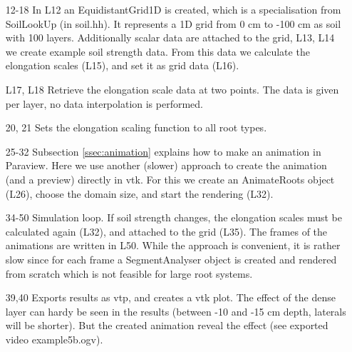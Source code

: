 \begin{itemize}

\item[12-18] In L12 an EquidistantGrid1D is created, which is a specialisation from SoilLookUp (in soil.hh). It represents a 1D grid from 0 cm to -100 cm as soil with 100 layers. Additionally scalar data are attached to the grid, L13, L14 we create example soil strength data. From this data we calculate the elongation scales (L15), and set it as grid data (L16). 

\item[L17, L18] Retrieve the elongation scale data at two points. The data is given per layer, no data interpolation is performed.

\item[20, 21] Sets the elongation scaling function to all root types.

\item[25-32] Subsection \ref{ssec:animation} explains how to make an animation in Paraview. Here we use another (slower) approach to create the animation (and a preview) directly in vtk. For this we create an AnimateRoots object (L26), choose the domain size, and start the rendering (L32). 

\item[34-50] Simulation loop. If soil strength changes, the elongation scales must be calculated again (L32), and attached to the grid (L35). The frames of the animations are written in L50. While the approach is convenient, it is rather slow since for each frame a SegmentAnalyser object is created and rendered from scratch which is not feasible for large root systems. 

\item[39,40] Exports results as vtp, and creates a vtk plot. The effect of the dense layer can hardy be seen in the results (between -10 and -15 cm depth, laterals will be shorter). But the created animation reveal the effect (see exported video example5b.ogv). 

\end{itemize}

